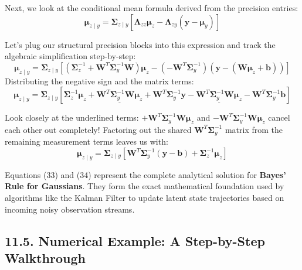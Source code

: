 \documentclass{article}
\begin{document}
Next, we look at the conditional mean formula derived from the precision entries:
\begin{equation*}
\boldsymbol{\mu}_{z \mid y} = \boldsymbol{\Sigma}_{z \mid y} \left[ \boldsymbol{\Lambda}_{zz}\boldsymbol{\mu}_z - \boldsymbol{\Lambda}_{zy}(\mathbf{y} - \boldsymbol{\mu}_y) \right]
\end{equation*}

Let's plug our structural precision blocks into this expression and track the algebraic simplification step-by-step:
\begin{equation*}
\boldsymbol{\mu}_{z \mid y} = \boldsymbol{\Sigma}_{z \mid y} \left[ \left(\boldsymbol{\Sigma}_z^{-1} + \mathbf{W}^T \boldsymbol{\Sigma}_y^{-1} \mathbf{W}\right)\boldsymbol{\mu}_z - \left(-\mathbf{W}^T \boldsymbol{\Sigma}_y^{-1}\right)(\mathbf{y} - (\mathbf{W}\boldsymbol{\mu}_z + \mathbf{b})) \right]
\end{equation*}
Distributing the negative sign and the matrix terms:
\begin{equation*}
\boldsymbol{\mu}_{z \mid y} = \boldsymbol{\Sigma}_{z \mid y} \left[ \boldsymbol{\Sigma}_z^{-1}\boldsymbol{\mu}_z + \underline{\mathbf{W}^T \boldsymbol{\Sigma}_y^{-1} \mathbf{W}\boldsymbol{\mu}_z} + \mathbf{W}^T \boldsymbol{\Sigma}_y^{-1}\mathbf{y} - \underline{\mathbf{W}^T \boldsymbol{\Sigma}_y^{-1}\mathbf{W}\boldsymbol{\mu}_z} - \mathbf{W}^T \boldsymbol{\Sigma}_y^{-1}\mathbf{b} \right]
\end{equation*}

Look closely at the underlined terms: $+\mathbf{W}^T \boldsymbol{\Sigma}_y^{-1} \mathbf{W}\boldsymbol{\mu}_z$ and $-\mathbf{W}^T \boldsymbol{\Sigma}_y^{-1} \mathbf{W}\boldsymbol{\mu}_z$ cancel each other out completely! Factoring out the shared $\mathbf{W}^T \boldsymbol{\Sigma}_y^{-1}$ matrix from the remaining measurement terms leaves us with:
\begin{equation}
\boldsymbol{\mu}_{z \mid y} = \boldsymbol{\Sigma}_{z \mid y} \left[ \mathbf{W}^T \boldsymbol{\Sigma}_y^{-1}(\mathbf{y} - \mathbf{b}) + \boldsymbol{\Sigma}_z^{-1}\boldsymbol{\mu}_z \right] \tag{34}
\end{equation}

Equations (33) and (34) represent the complete analytical solution for \textbf{Bayes' Rule for Gaussians}. They form the exact mathematical foundation used by algorithms like the Kalman Filter to update latent state trajectories based on incoming noisy observation streams.

\subsection*{11.5. Numerical Example: A Step-by-Step Walkthrough}
\end{document}
